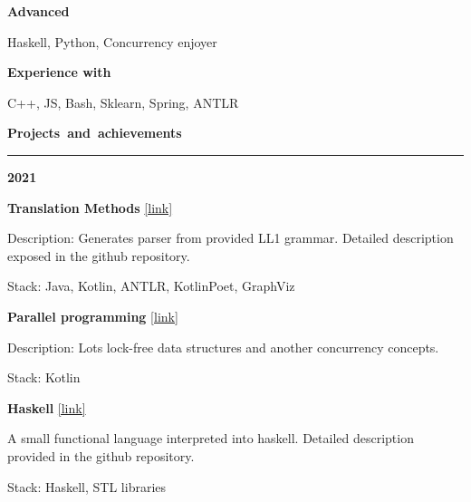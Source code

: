 \documentclass[11pt,a4paper]{report}
\begin{document}
\textbf{Advanced}

\vspace{5px}
\hspace{10px}
Haskell, Python, Concurrency enjoyer
\vspace{5px}

\textbf{Experience with}

\vspace{5px}
\hspace{10px}
C++, JS, Bash, Sklearn, Spring, ANTLR
\vspace{10px}


\par\hbox{\Large\textbf{Projects and achievements}}\kern5pt\hrule

\vspace{10px}
\textbf{\Large{2021}}

\hspace{10px} \textbf{Translation Methods} \href{https://github.com/Kvel4/Translation-Methods}{[link]}

\hspace{20px} Description: Generates parser from provided LL1 grammar. Detailed description exposed in the github repository.

\hspace{20px} Stack: Java, Kotlin, ANTLR, KotlinPoet, GraphViz

\vspace{10px}


\hspace{10px} \textbf{Parallel programming} \href{https://github.com/Kvel4/itmo-mpp}{[link]}

\hspace{20px} Description: Lots lock-free data structures and another concurrency concepts.

\hspace{20px} Stack: Kotlin

\vspace{10px}


\hspace{10px} \textbf{Haskell} \href{https://github.com/Kvel4/haskell}{[link]}

\hspace{20px} A small functional language interpreted into haskell. Detailed description provided in the github repository.

\hspace{20px} Stack: Haskell, STL libraries

\vspace{10px}
\end{document}
